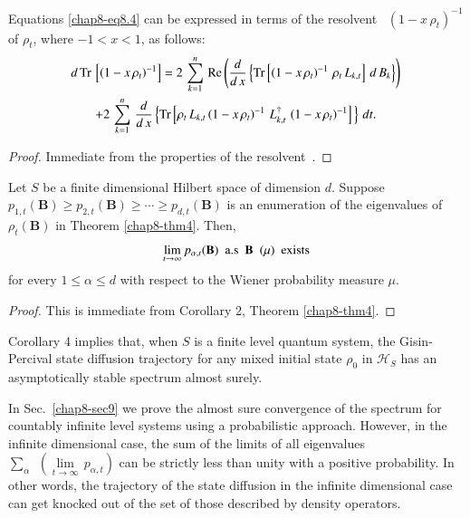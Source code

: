 \begin{coro} %
Equations \eqref{chap8-eq8.4} can be expressed in terms of the resolvent~\cite{chap8-key44} $\left(1-x\, \rho_t\right)^{-1}$ of $\rho_t$, where $-1 < x < 1$, as follows: 
\begin{multline}
d\, {\rm Tr}\,\left[\left(1-x\, \rho_t\right)^{-1}\right]= 2\, \sum_{k=1}^{n}\, {\rm Re}\left(\frac{d}{d\,x}\left\{{\rm Tr}\left[\left(1-x\, \rho_t\right)^{-1}\, \rho_t\, L_{k,t}\right]\, d\, B_{k}\right\}\right) \\ 
+2\, \sum_{k=1}^{n}\, \frac{d}{d\,x}\left\{{\rm Tr}\left[ \rho_t\, L_{k,t}\left(1-x\, \rho_t\right)^{-1}\, L_{k,t}^\dag\, \left(1-x\, \rho_t\right)^{-1}  \right]\, \right\}\, dt. \label{chap8-eq8.9}
\end{multline}
\end{coro}
     
\begin{proof}
Immediate from the properties of the resolvent~\cite{chap8-key44}.
\end{proof}
\begin{coro} %
Let $S$ be a finite dimensional Hilbert space of dimension $d$.  Suppose $p_{1,t}(\mathbf{B})\geq p_{2,t}(\mathbf{B})\geq \cdots \geq p_{d,t}(\mathbf{B})$ is an enumeration of the eigenvalues of $\rho_t(\mathbf{B})$ in Theorem \ref{chap8-thm4}. Then, 
$$
\underset{t\rightarrow\infty}{\lim}\, p_{\alpha,t}(\mathbf{B})\ \ {\rm a.s}\ \ \mathbf{B}\ \ (\mu)\ \ {\rm exists}
$$ 
for every $1\leq \alpha\leq d$ with respect to the Wiener probability measure $\mu$. 
\end{coro}
\begin{proof}
This is immediate from Corollary 2, Theorem \ref{chap8-thm4}.
\end{proof}

\begin{remark}
Corollary 4 implies that, when $S$ is a finite level quantum system, the Gisin-Percival state diffusion trajectory for any mixed initial state $\rho_0$ in $\mathcal{H}_S$ has an asymptotically stable spectrum  almost surely. 
\end{remark}

In Sec.\ \ref{chap8-sec9} we prove the almost sure convergence of the spectrum for countably infinite level systems using a probabilistic approach. However, in the infinite dimensional case, the sum of the limits of all eigenvalues ${\displaystyle\sum_{\alpha}}\ \ \left(\underset{t\rightarrow\infty}{\lim}\,  p_{\alpha,t}\right)$ can be strictly less than unity with a positive probability. In other words, the trajectory of the state diffusion in the infinite dimensional case can get knocked out of the set of  those described by  density operators. 

